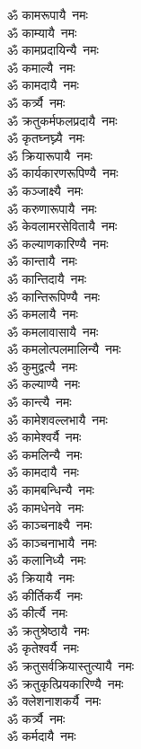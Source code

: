\begin{flushleft}
\begin{multicols}{2}
ॐ कामरूपायै~नमः\\
ॐ काम्यायै~नमः\\
ॐ कामप्रदायिन्यै~नमः\hfill{}\\
ॐ कमाल्यै~नमः\\
ॐ कामदायै~नमः\\
ॐ कर्त्र्यै~नमः\\
ॐ क्रतुकर्मफलप्रदायै~नमः\\
ॐ कृतघ्नघ्न्यै~नमः\\
ॐ क्रियारूपायै~नमः\\
ॐ कार्यकारणरूपिण्यै~नमः\\
ॐ कञ्जाक्ष्यै~नमः\\
ॐ करुणारूपायै~नमः\\
ॐ केवलामरसेवितायै~नमः\hfill{}\\
ॐ कल्याणकारिण्यै~नमः\\
ॐ कान्तायै~नमः\\
ॐ कान्तिदायै~नमः\\
ॐ कान्तिरूपिण्यै~नमः\\
ॐ कमलायै~नमः\\
ॐ कमलावासायै~नमः\\
ॐ कमलोत्पलमालिन्यै~नमः\\
ॐ कुमुद्वत्यै~नमः\\
ॐ कल्याण्यै~नमः\\
ॐ कान्त्यै~नमः\hfill{}\\
ॐ कामेशवल्लभायै~नमः\\
ॐ कामेश्वर्यै~नमः\\
ॐ कमलिन्यै~नमः\\
ॐ कामदायै~नमः\\
ॐ कामबन्धिन्यै~नमः\\
ॐ कामधेनवे~नमः\\
ॐ काञ्चनाक्ष्यै~नमः\\
ॐ काञ्चनाभायै~नमः\\
ॐ कलानिध्यै~नमः\\
ॐ क्रियायै~नमः\hfill{}\\
ॐ कीर्तिकर्यै~नमः\\
ॐ कीर्त्यै~नमः\\
ॐ क्रतुश्रेष्ठायै~नमः\\
ॐ कृतेश्वर्यै~नमः\\
ॐ क्रतुसर्वक्रियास्तुत्यायै~नमः\\
ॐ क्रतुकृत्प्रियकारिण्यै~नमः\\
ॐ क्लेशनाशकर्यै~नमः\\
ॐ कर्त्र्यै~नमः\\
ॐ कर्मदायै~नमः\\

\end{multicols}
\end{flushleft}
